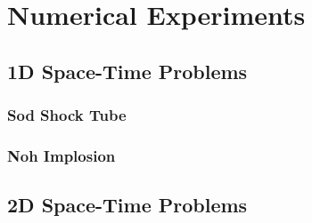 \documentclass[Dissertation.tex]{subfiles}
\begin{document}
\section{Numerical Experiments}
\subsection{1D Space-Time Problems}
\subsubsection{Sod Shock Tube}

\subsubsection{Noh Implosion}

\subsection{2D Space-Time Problems}
\end{document}

